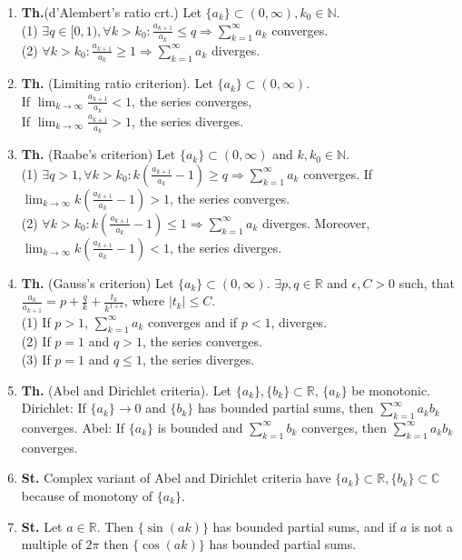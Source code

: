 \documentclass{article}
\newcommand{\<}{\left<}
\renewcommand{\>}{\right>}
\newcommand{\N}{\mathbb{N}}
\newcommand{\R}{\mathbb{R}}
\newcommand{\C}{\mathbb{C}}
\newcommand{\state}{\textbf{St. }}
\newcommand{\theor}{\textbf{Th. }}
\begin{document}
\begin{multicols}{3}
\begin{enumerate}[itemsep=2pt, topsep=2pt, partopsep=2pt, parsep=2pt]
        \item \textbf{Th.}(d'Alembert's ratio crt.) Let $\{a_k\}\subset(0,\infty),k_0\in\N$.\\
        (1) $\exists q\in[0,1),\forall k>k_0:\frac{a_{k+1}}{a_k}\leq q\Rightarrow\sum_{k=1}^\infty a_k$ converges.\\
        (2) $\forall k>k_0:\frac{a_{k+1}}{a_k}\geq 1\Rightarrow\sum_{k=1}^\infty a_k$ diverges.
        \item \theor (Limiting ratio criterion). Let $\{a_k\}\subset(0,\infty)$.\\
        If $\lim_{k\to\infty}\frac{a_{k+1}}{a_k}<1$, the series converges,\\
        If $\lim_{k\to\infty}\frac{a_{k+1}}{a_k}>1$, the series diverges.
        \item \theor (Raabe's criterion) Let $\{a_k\}\subset(0,\infty)$ and $k,k_0\in\N$.\\
        (1) $\exists q>1,\forall k>k_0:k(\frac{a_{k+1}}{a_k}-1)\geq q\Rightarrow\sum_{k=1}^\infty a_k$ converges. If $\lim_{k\to\infty}k(\frac{a_{k+1}}{a_k}-1)>1$, the series converges.\\
        (2) $\forall k>k_0:k(\frac{a_{k+1}}{a_k}-1)\leq 1\Rightarrow\sum_{k=1}^\infty a_k$ diverges. Moreover, $\lim_{k\to\infty}k(\frac{a_{k+1}}{a_k}-1)<1$, the series diverges.\\
        \item \theor (Gauss's criterion) Let $\{a_k\}\subset(0,\infty)$. $\exists p,q\in\R$ and $\epsilon,C>0$ such, that $\frac{a_k}{a_{k+1}}=p+\frac{q}{k}+\frac{t_k}{k^{1+\epsilon}}$, where $|t_k|\leq C$.\\
        (1) If $p>1$, $\sum_{k=1}^\infty a_k$ converges and if $p<1$, diverges.\\
        (2) If $p=1$ and $q>1$, the series converges.\\ (3) If $p=1$ and $q\leq 1$, the series diverges.


        \item \theor (Abel and Dirichlet criteria). Let $\{a_k\},\{b_k\}\subset\R$, $\{a_k\}$ be monotonic. Dirichlet: If $\{a_k\}\to 0$ and $\{b_k\}$ has bounded partial sums, then $\sum_{k=1}^\infty a_kb_k$ converges.
        Abel: If $\{a_k\}$ is bounded and $\sum_{k=1}^\infty b_k$ converges, then $\sum_{k=1}^\infty a_kb_k$ converges.
        \item \state Complex variant of Abel and Dirichlet criteria have $\{a_k\}\subset\R,\{b_k\}\subset\C$ because of monotony of $\{a_k\}$.
        \item \state Let $a\in\R$. Then $\{\sin(ak)\}$ has bounded partial sums, and if $a$ is not a multiple of $2\pi$ then $\{\cos(ak)\}$ has bounded partial sums.


\end{enumerate}
\end{multicols}
\end{document}

